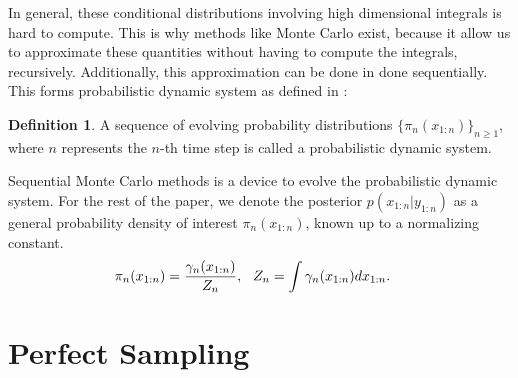 \documentclass[10pt]{article}
\theoremstyle{definition}
\newtheorem{definition}{Definition}
\numberwithin{equation}{section}
\begin{document}
In general, these conditional distributions involving high dimensional integrals is hard to compute. This is why methods like Monte Carlo exist, because it allow us to approximate these quantities without having to compute the integrals, recursively. Additionally, this approximation can be done in done sequentially. This forms probabilistic dynamic system as defined in \cite{liu1998sequential}:
\begin{definition}
	A sequence of evolving probability distributions $\{\pi_n(x_{1:n})\}_{n \geq 1}$, where $n$ represents the $n$-th time step is called a probabilistic dynamic system. 
\end{definition}
Sequential Monte Carlo methods is a device to evolve the probabilistic dynamic system. For the rest of the paper, we denote the posterior $p(x_{1:n}|y_{1:n})$ as a general probability density of interest $\pi_n(x_{1:n})$, known up to a normalizing constant.
\begin{align}
\pi_n(x_{1:n}) = \dfrac{\gamma_n(x_{1:n})}{Z_n}, &{\hspace{3mm} Z_n = \int \gamma_n(x_{1:n}) d{x_{1:n}}}.
\end{align}




\section{Perfect Sampling}
\end{document}
